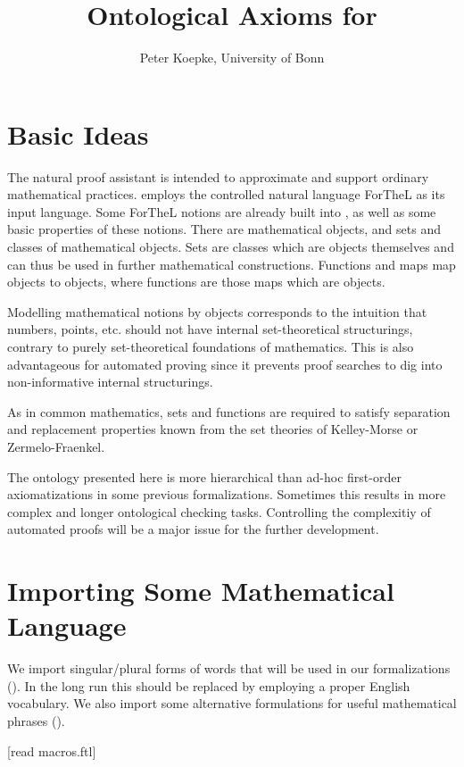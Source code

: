 \documentclass[11pt]{article}
\author{Peter Koepke, University of Bonn}
\title{Ontological Axioms for \Naproche}
\begin{document}
\maketitle

\section{Basic Ideas}

The natural proof assistant \Naproche is intended to
approximate and support ordinary mathematical practices.
\Naproche employs the controlled natural language ForTheL
as its input language. Some ForTheL notions are already
built into \Naproche, as well as some basic properties of
these notions.
There are
mathematical objects, and sets and classes of mathematical
objects. Sets are classes which are objects themselves and
can thus be used in further mathematical constructions. Functions
and maps map objects to objects, where functions are those
maps which are objects.

Modelling mathematical notions by objects corresponds
to the intuition that numbers, points, etc. should
not have internal set-theoretical
structurings, contrary to purely set-theoretical
foundations of mathematics. This is also advantageous
for automated proving since it prevents proof searches to
dig into non-informative internal structurings.

As in common mathematics, sets and functions are required to
satisfy separation and replacement properties known from the
set theories of Kelley-Morse or Zermelo-Fraenkel.

The ontology presented here is more hierarchical than
ad-hoc first-order axiomatizations in some previous
\Naproche formalizations. Sometimes
this results in more complex and longer ontological checking tasks.
Controlling the complexitiy of automated proofs will be a major
issue for the further development.

\section{Importing Some Mathematical Language}
We import singular/plural forms of words that will be used in
our formalizations ().
In the long run this should be replaced by
employing a proper English vocabulary. We also
import some alternative formulations for
useful mathematical phrases ().
\begin{forthel}

[read macros.ftl]
\end{forthel}
\end{document}
